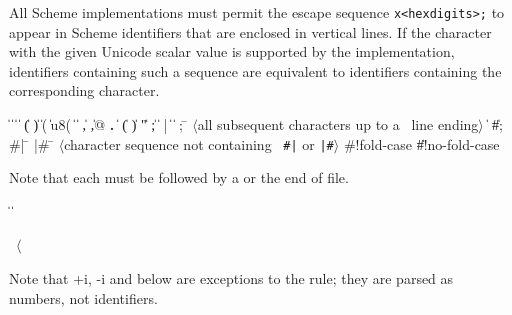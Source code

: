 All Scheme implementations must permit the escape sequence
{\tt \backwhack{}x<hexdigits>;}
to appear in Scheme identifiers that are enclosed in vertical lines. If the character
with the given Unicode scalar value is supported by the implementation,
identifiers containing such a sequence are equivalent to identifiers
containing the corresponding character. 

\begin{grammar}%
 \:  \|  \| 
\>  \|  \| 
\>  \| ( \| ) \| \sharpsign( \| \sharpsign u8( \| \singlequote{} \| \backquote{} \| , \| ,@ \| {\bf.}
 \:  \| 
\> \| ( \| ) \| " \| ;
 \: 
 \:  \| 
 \: |
 \:  \|  
\> \| 
 \: ; \= $\langle$\rm all subsequent characters up to a
		    \>\ \rm line ending$\rangle$
\> \| 
\> \| \#;  
 \: \#| \= 
\>  |\#
 \: \= $\langle$\rm character sequence not containing
\>\ \rm {\tt \#|} or {\tt |\#}$\rangle$
 \:  
 \: \#!fold-case \| \#!no-fold-case%
\end{grammar}

Note that each  must be followed by a 
or the end of file.

\begin{grammar}%
 \:  \|  \| 
 \: %
\end{grammar}

\label{extendedalphas}
\label{identifiersyntax}

\hbox{\cf{} \goesto{} $\langle$}

Note that +i, -i and  below are exceptions to the
 rule; they are parsed as numbers, not
identifiers.

